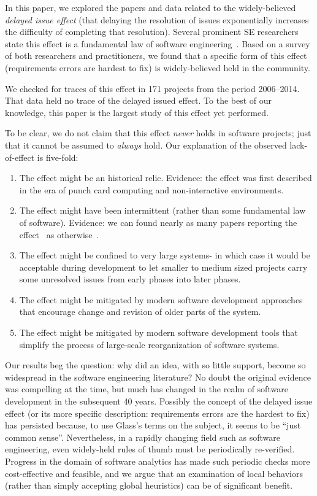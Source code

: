 \documentclass[smallcondesed]{svjour3}
\newcommand{\be}{\begin{enumerate}}
\newcommand{\ee}{\end{enumerate}}
\begin{document}
 
In this paper, we explored   the papers and data related to the 
widely-believed {\em delayed issue effect} (that delaying the resolution of issues
exponentially 
increases the difficulty of completing that  resolution).
Several prominent SE researchers state this effect is a fundamental law of software engineering~\cite{boehm01,mcconnell01,boehm01,glass02}.
Based on a  survey  of both researchers and practitioners, we  found that
a specific form  of this effect (requirements errors are hardest to fix) is  widely-believed
held in the community.  

We checked for traces of this effect in 171 projects from the period 2006--2014.
That data held no trace of the delayed issued effect.
To the best of our knowledge, this paper is the  largest study
of this effect yet performed.

To be clear, we do not claim that this effect {\em never} holds in software projects; just that it cannot be assumed to {\em always} hold. Our explanation of the observed lack-of-effect is five-fold:
\be
\item The effect might be an historical relic. Evidence:
the effect was first described in the era of punch card computing and non-interactive environments.
\item The effect might have been intermittent (rather than some fundamental law of software). Evidence: we can  found nearly
as many papers reporting the effect~\cite{Boehm76,Boehm81,steck04,Fagan76,Stephenson76} as otherwise~\cite{Royce98,Boehm80,Shull02}.
\item The effect might be confined to very large systems- in which case it would be
acceptable during development to let smaller to medium
sized projects carry some unresolved issues from early phases into later phases.
\item The effect might be mitigated by modern software development approaches that
encourage change and revision of older parts of the system.
\item The effect might be mitigated by modern software development tools
that simplify the process of large-scale reorganization of software systems.
\ee
  
Our results beg the question: why did an idea, with so little support, become so widespread in the software engineering literature? No doubt the original evidence was compelling at the time, but much has changed in the realm of software development in the subsequent 40 years. Possibly the concept of the delayed issue effect (or its more specific description: requirements errors are the hardest to fix)
has persisted because, to use Glass's terms on the subject, it seems to be ``just common sense''\cite{glass02}. 
Nevertheless, in a rapidly changing field such as software engineering, even widely-held rules of thumb must be periodically re-verified. 
Progress in the domain of software analytics has made such periodic checks more cost-effective and feasible, and we argue that an examination of local behaviors (rather than simply accepting global heuristics) can be of significant benefit.
\end{document}
